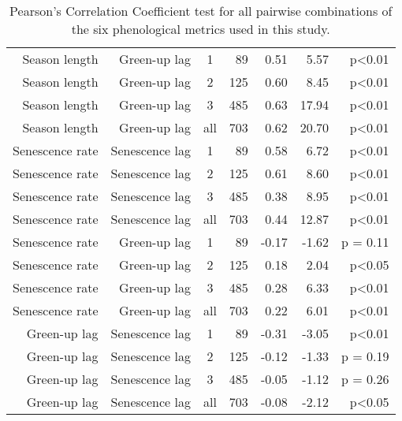 \begin{table}[H]
\begin{tabular}{rrcrrrr}
   \hline
Season length & Green-up lag & 1 &  89 & 0.51 & 5.57 & p<0.01 \\ 
  Season length & Green-up lag & 2 & 125 & 0.60 & 8.45 & p<0.01 \\ 
  Season length & Green-up lag & 3 & 485 & 0.63 & 17.94 & p<0.01 \\ 
  Season length & Green-up lag & all & 703 & 0.62 & 20.70 & p<0.01 \\ 
   \hline
Senescence rate & Senescence lag & 1 &  89 & 0.58 & 6.72 & p<0.01 \\ 
  Senescence rate & Senescence lag & 2 & 125 & 0.61 & 8.60 & p<0.01 \\ 
  Senescence rate & Senescence lag & 3 & 485 & 0.38 & 8.95 & p<0.01 \\ 
  Senescence rate & Senescence lag & all & 703 & 0.44 & 12.87 & p<0.01 \\ 
   \hline
Senescence rate & Green-up lag & 1 &  89 & -0.17 & -1.62 & p = 0.11 \\ 
  Senescence rate & Green-up lag & 2 & 125 & 0.18 & 2.04 & p<0.05 \\ 
  Senescence rate & Green-up lag & 3 & 485 & 0.28 & 6.33 & p<0.01 \\ 
  Senescence rate & Green-up lag & all & 703 & 0.22 & 6.01 & p<0.01 \\ 
   \hline
Green-up lag & Senescence lag & 1 &  89 & -0.31 & -3.05 & p<0.01 \\ 
  Green-up lag & Senescence lag & 2 & 125 & -0.12 & -1.33 & p = 0.19 \\ 
  Green-up lag & Senescence lag & 3 & 485 & -0.05 & -1.12 & p = 0.26 \\ 
  Green-up lag & Senescence lag & all & 703 & -0.08 & -2.12 & p<0.05 \\ 
   \hline
\end{tabular}
\caption{Pearson's Correlation Coefficient test for all pairwise combinations of the six phenological metrics used in this study.} 
\label{phen_corr}
\end{table}


